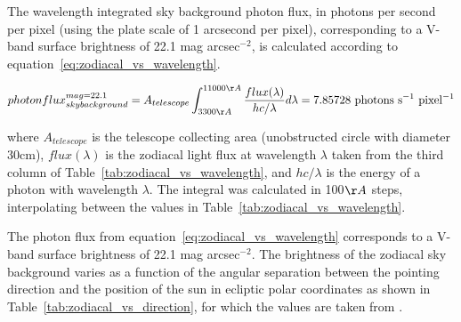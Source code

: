 \documentclass[11pt]{article}      %
\begin{document}
The wavelength integrated sky background photon flux, in photons per second per pixel (using the plate scale of 1 arcsecond per pixel), corresponding to a V-band surface brightness of 22.1 mag arcsec$^{−2}$, is calculated according to equation~\ref{eq:zodiacal_vs_wavelength}.

\begin{equation}
\label{eq:zodiacal_vs_wavelength}
photonflux_{skybackground}^{mag=22.1} = A_{telescope}\int_{3300\AA}^{11000\AA}{\frac{flux(\lambda)}{hc/\lambda}d\lambda} = 7.85728\ \mathrm{photons\ s^{-1} \ pixel^{-1}}
\end{equation}

where $A_{telescope}$ is the telescope collecting area (unobstructed circle with diameter 30cm), $flux(\lambda)$ is the zodiacal light flux at wavelength $\lambda$ taken from the third column of  Table~\ref{tab:zodiacal_vs_wavelength}, and $hc/\lambda$ is the energy of a photon with wavelength $\lambda$. The integral was calculated in 100$\AA$ steps, interpolating between the values in Table~\ref{tab:zodiacal_vs_wavelength}.

The photon flux from equation~\ref{eq:zodiacal_vs_wavelength} corresponds to a V-band surface brightness of 22.1 mag arcsec$^{−2}$. The brightness of the zodiacal sky background varies as a function of the angular separation between the pointing direction and the position of the sun in ecliptic polar coordinates as shown in Table~\ref{tab:zodiacal_vs_direction}, for which the values are taken from \cite{HST_ETC}.
\end{document}
